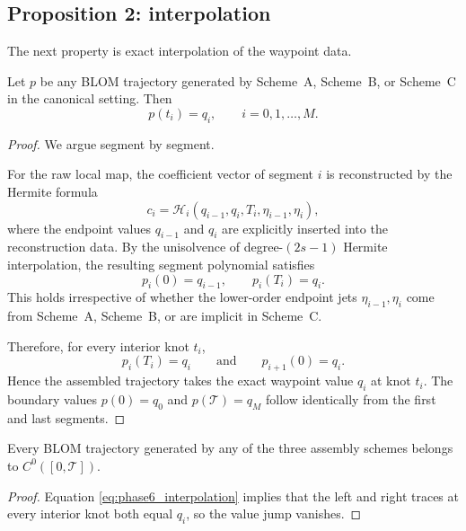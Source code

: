 \subsection{Proposition 2: interpolation}
\label{subsec:phase6_prop2}

The next property is exact interpolation of the waypoint data.

\begin{proposition}
\label{prop:phase6_interpolation}
Let \(p\) be any BLOM trajectory generated by Scheme~A, Scheme~B, or Scheme~C in the canonical setting.
Then
\begin{equation}
\label{eq:phase6_interpolation}
p(t_i)=q_i,
\qquad i=0,1,\dots,M.
\end{equation}
\end{proposition}

\begin{proof}
We argue segment by segment.

For the raw local map, the coefficient vector of segment \(i\) is reconstructed by the Hermite formula
\[
c_i
=
\mathcal H_i(q_{i-1},q_i,T_i,\eta_{i-1},\eta_i),
\]
where the endpoint values \(q_{i-1}\) and \(q_i\) are explicitly inserted into the reconstruction data.
By the unisolvence of degree-\((2s-1)\) Hermite interpolation, the resulting segment polynomial satisfies
\[
p_i(0)=q_{i-1},
\qquad
p_i(T_i)=q_i.
\]
This holds irrespective of whether the lower-order endpoint jets \(\eta_{i-1},\eta_i\) come from Scheme~A, Scheme~B, or are implicit in Scheme~C.

Therefore, for every interior knot \(t_i\),
\[
p_i(T_i)=q_i
\qquad\text{and}\qquad
p_{i+1}(0)=q_i.
\]
Hence the assembled trajectory takes the exact waypoint value \(q_i\) at knot \(t_i\).
The boundary values \(p(0)=q_0\) and \(p(\mathcal T)=q_M\) follow identically from the first and last segments.
\end{proof}

\begin{corollary}
\label{cor:phase6_C0}
Every BLOM trajectory generated by any of the three assembly schemes belongs to \(C^0([0,\mathcal T])\).
\end{corollary}

\begin{proof}
Equation \eqref{eq:phase6_interpolation} implies that the left and right traces at every interior knot both equal \(q_i\), so the value jump vanishes.
\end{proof}

